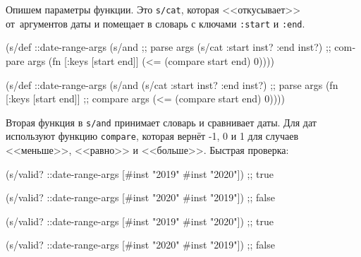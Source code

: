 Опишем параметры функции. Это \verb|s/cat|, которая <<откусывает>>
от~аргументов даты и помещает в словарь с ключами \verb|:start| и
\verb|:end|.

\ifx\DEVICETYPE\MOBILE

\begin{english}
  \begin{clojure}
(s/def ::date-range-args
  (s/and
    ;; parse args
    (s/cat :start inst? :end inst?)
    ;; compare args
    (fn [{:keys [start end]}]
      (<= (compare start end) 0))))
  \end{clojure}
\end{english}

\else

\begin{english}
  \begin{clojure}
(s/def ::date-range-args
  (s/and
   (s/cat :start inst? :end inst?) ;; parse args
   (fn [{:keys [start end]}]       ;; compare args
     (<= (compare start end) 0))))
  \end{clojure}
\end{english}

\fi


Вторая функция в \verb|s/and| принимает словарь и сравнивает даты. Для дат
используют функцию \verb|compare|, которая вернёт -1, 0 и 1 для случаев
<<меньше>>, <<равно>> и <<больше>>. Быстрая проверка:

\ifx\DEVICETYPE\MOBILE

\begin{english}
  \begin{clojure}
(s/valid? ::date-range-args
          [#inst "2019" #inst "2020"])
;; true

(s/valid? ::date-range-args
          [#inst "2020" #inst "2019"])
;; false
  \end{clojure}
\end{english}

\else

\begin{english}
  \begin{clojure}
(s/valid? ::date-range-args
          [#inst "2019" #inst "2020"]) ;; true

(s/valid? ::date-range-args
          [#inst "2020" #inst "2019"]) ;; false
  \end{clojure}
\end{english}

\fi


